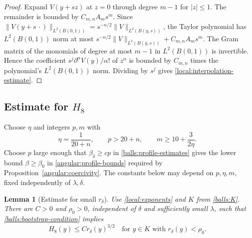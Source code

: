 \documentclass[11pt,a4paper]{article}
\newtheorem{lemma}[theorem]{Lemma}
\theoremstyle{definition}
\theoremstyle{remark}
\numberwithin{equation}{section}
\begin{document}
\begin{proof}
Expand $V(y+sz)$ at $z=0$ through degree $m-1$ for $|z|\le1$.
The remainder is bounded by $C_{m,n}A_m s^m$. Since
$\|V(y+s\,\cdot)\|_{L^2(B(0,1))}
=s^{-n/2}\|V\|_{L^2(B(y,s))}$, the Taylor polynomial has
$L^2(B(0,1))$ norm at most
$s^{-n/2}\|V\|_{L^2(B(y,s))}+C_{m,n}A_m s^m$.
The Gram matrix of the monomials of degree at most $m-1$ in
$L^2(B(0,1))$ is invertible. Hence the coefficient
$s^j\partial^\alpha V(y)/\alpha!$ of $z^\alpha$ is bounded by
$C_{m,n}$ times the polynomial's $L^2(B(0,1))$ norm.
Dividing by $s^j$ gives \eqref{local:interpolation-estimate}.
\end{proof}

\subsection{Estimate for \texorpdfstring{$H_8$}{H8}}

Choose $\eta$ and integers $p,m$ with
\begin{equation}\label{local:exponents}
 \eta=\frac{1}{20+n},\qquad p>20+n,\qquad
 m\geq 10+\frac{3}{2\eta}.
\end{equation}
Choose $p$ large enough that $\beta_\delta\ge cp$ in
\eqref{balls:profile-estimates} gives the lower bound
$\beta\ge\beta_0$ in \eqref{angular:profile-bounds} required by
Proposition~\ref{angular:coercivity}. The constants below may
depend on $p,\eta,m$, fixed independently of $\lambda,\delta$.

\begin{lemma}[Estimate for small $r_\delta$]\label{local:improvement}
Use \eqref{local:exponents} and $K$ from \eqref{balls:K}.
There are $C>0$ and $\rho_0>0$, independent of $\delta$
and sufficiently small $\lambda$, such that
\eqref{balls:bootstrap-condition} implies
\begin{equation}\label{local:superlinear}
 H_8(y)\leq C r_\delta(y)^{3/2}
 \quad\text{for }y\in K\text{ with }r_\delta(y)<\rho_0.
\end{equation}
\end{lemma}
\end{document}
